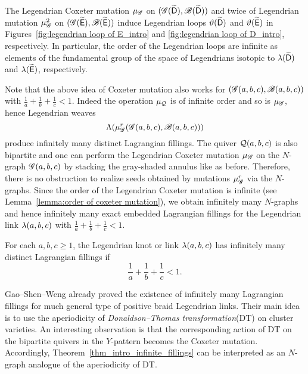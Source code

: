 \begin{theorem}\label{theorem:legendrian loop}
The Legendrian Coxeter mutation $\mu_\mathscr{G}$ on 
$(\mathscr{G}(\widetilde{\mathsf{D}}),\mathscr{B}(\widetilde{\mathsf{D}}))$ and twice of Legendrian mutation 
$\mu_\mathscr{G}^{2}$ on $(\mathscr{G}(\widetilde{\mathsf{E}}),\mathscr{B}(\widetilde{\mathsf{E}}))$ induce 
Legendrian loops $\vartheta(\widetilde{\mathsf{D}})$ and $\vartheta(\widetilde{\mathsf{E}})$ in Figures~\ref{fig:legendrian loop of E_intro} and \ref{fig:legendrian loop of D_intro}, respectively. 
In particular, the order of the Legendrian loops are infinite as elements of the fundamental group of the space of Legendrians isotopic to $\lambda(\widetilde{\mathsf{D}})$ and $\lambda(\widetilde{\mathsf{E}})$, respectively.
\end{theorem}

Note that the above idea of Coxeter mutation also works for $(\mathscr{G}(a,b,c),\mathscr{B}(a,b,c))$ with $\frac{1}{a}+\frac{1}{b}+\frac{1}{c} < 1$. Indeed the operation $\mu_{\mathcal{Q}}$ is of infinite order and so is $\mu_\mathscr{G}$, hence Legendrian weaves 
\[\Lambda(\mu_\mathscr{G}^r(\mathscr{G}(a,b,c),\mathscr{B}(a,b,c)))\]
produce infinitely many distinct Lagrangian fillings.
The quiver $\mathcal{Q}(a,b,c)$ is also bipartite and one can perform 
the Legendrian Coxeter mutation $\mu_{\mathscr{G}}$ on the $N$-graph $\mathscr{G}(a,b,c)$ by stacking the gray-shaded annulus like as before. Therefore, there is no obstruction to
realize seeds obtained by mutations $\mu_\mathscr{G}^r$ via the $N$-graphs.
Since the order of the Legendrian Coxeter mutation is infinite (see Lemma~\ref{lemma:order of coxeter mutation}), we obtain infinitely many $N$-graphs
and hence infinitely many exact embedded Lagrangian fillings for the Legendrian
link $\lambda(a,b,c)$ with $\frac{1}{a}+\frac{1}{b}+\frac{1}{c} < 1$.

\begin{theorem}\label{thm_intro_infinite_fillings}
For each $a,b,c\ge 1$, the Legendrian knot or link $\lambda(a,b,c)$ has 
infinitely many distinct Lagrangian fillings if
\[
\frac1a+\frac1b+\frac1c < 1.
\]
\end{theorem}

Gao--Shen--Weng \cite{GSW2020b} already proved the existence of infinitely many Lagrangian fillings for much general type of positive braid Legendrian links. Their main idea is to use the aperiodicity of \emph{Donaldson--Thomas transformation}(DT) on cluster varieties. An interesting observation is that the corresponding action of DT on the bipartite quivers in the $Y$-pattern becomes the Coxeter mutation. Accordingly, Theorem~\ref{thm_intro_infinite_fillings} can be interpreted as an $N$-graph analogue of the aperiodicity of DT.


